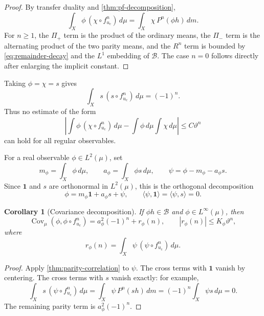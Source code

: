 \documentclass[11pt]{article}
\newtheorem{corollary}[theorem]{Corollary}
\theoremstyle{definition}
\theoremstyle{remark}
\newcommand{\uc}{u_{\mathrm c}}
\newcommand{\cB}{\mathcal B}
\newcommand{\one}{\mathbf 1}
\newcommand{\Cov}{\operatorname{Cov}}
\begin{document}
\begin{proof}
By transfer duality and \cref{thm:pf-decomposition},
\[
    \int_X\phi\,(\chi\circ f_{\uc}^n)\,d\mu
    =\int_X\chi\,P^n(\phi h)\,dm.
\]
For $n\ge1$, the $\Pi_+$ term is the product of the ordinary means, the $\Pi_-$ term is the alternating product of the two parity means, and the $R^n$ term is bounded by \eqref{eq:remainder-decay} and the $L^1$ embedding of $\cB$.  The case $n=0$ follows directly after enlarging the implicit constant.
\end{proof}

Taking $\phi=\chi=s$ gives
\begin{equation}\label{eq:parity-nondecay}
    \int_Xs\,(s\circ f_{\uc}^n)\,d\mu=(-1)^n.
\end{equation}
Thus no estimate of the form
\[
    \left|\int\phi\,(\chi\circ f_{\uc}^n)\,d\mu
    -\int\phi\,d\mu\int\chi\,d\mu\right|
    \le C\vartheta^n
\]
can hold for all regular observables.

For a real observable $\phi\in L^2(\mu)$, set
\begin{equation}\label{eq:observable-components}
    m_\phi=\int_X\phi\,d\mu,
    \qquad
    a_\phi=\int_X\phi s\,d\mu,
    \qquad
    \psi=\phi-m_\phi-a_\phi s.
\end{equation}
Since $\one$ and $s$ are orthonormal in $L^2(\mu)$, this is the orthogonal decomposition
\begin{equation}\label{eq:observable-decomposition}
    \phi=m_\phi\one+a_\phi s+\psi,
    \qquad
    \langle\psi,\one\rangle=\langle\psi,s\rangle=0.
\end{equation}

\begin{corollary}[Covariance decomposition]\label{cor:covariance}
If $\phi h\in\cB$ and $\phi\in L^\infty(\mu)$, then
\begin{equation}\label{eq:covariance-decomposition}
    \Cov_\mu(\phi,\phi\circ f_{\uc}^n)
    =a_\phi^2(-1)^n+r_\phi(n),
    \qquad
    |r_\phi(n)|\le K_\phi\vartheta^n,
\end{equation}
where
\[
    r_\phi(n)=\int_X\psi\,(\psi\circ f_{\uc}^n)\,d\mu.
\]
\end{corollary}

\begin{proof}
Apply \cref{thm:parity-correlation} to $\psi$.  The cross terms with $\one$ vanish by centering.  The cross terms with $s$ vanish exactly: for example,
\[
    \int_Xs\,(\psi\circ f_{\uc}^n)\,d\mu
    =\int_X\psi\,P^n(sh)\,dm
    =(-1)^n\int_X\psi s\,d\mu=0.
\]
The remaining parity term is $a_\phi^2(-1)^n$.
\end{proof}
\end{document}
